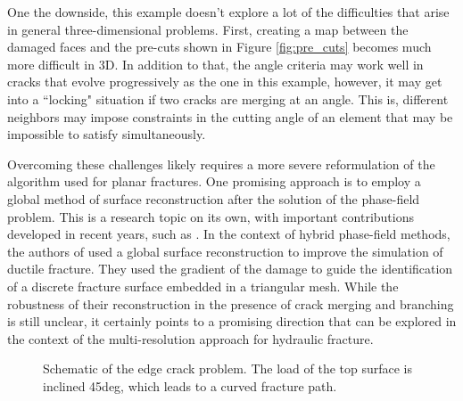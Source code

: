 One the downside, this example doesn't explore a lot of the difficulties that arise in general three-dimensional problems. 
First, creating a map between the damaged faces and the pre-cuts shown in Figure \ref{fig:pre_cuts} becomes much more difficult in 3D. In addition to that, the angle criteria may work well in cracks that evolve progressively as the one in this example, however, it may get into a ``locking" situation if two cracks are merging at an angle. This is, different neighbors may impose constraints in the cutting angle of an element that may be impossible to satisfy simultaneously. 

Overcoming these challenges likely requires a more severe reformulation of the algorithm used for planar fractures. One promising approach is to employ a global method of surface reconstruction after the solution of the phase-field problem. This is a research topic on its own, with important contributions developed in recent years, such as \cite{yang2021explicit, zeng2022tracking, xu2023reconstruct}. In the context of hybrid phase-field methods, the authors of \cite{eldahshan2021cipfar} used a global surface reconstruction to improve the simulation of ductile fracture. They used the gradient of the damage to guide the identification of a discrete fracture surface embedded in a triangular mesh. While the robustness of their reconstruction in the presence of crack merging and branching is still unclear, it certainly points to a promising direction that can be explored in the context of the multi-resolution approach for hydraulic fracture.

\begin{figure}[ht]
    \centering
    \caption{Schematic of the edge crack problem. The load of the top surface is inclined 45deg, which leads to a curved fracture path.}
    \label{fig:nonplanar_schematic}
\end{figure}

